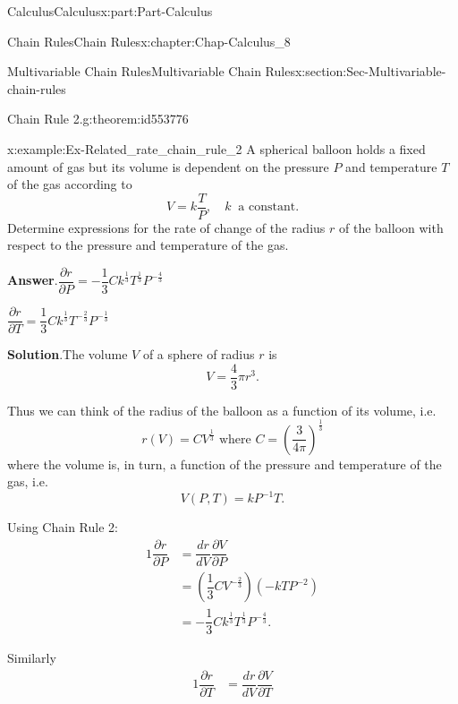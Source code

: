 \documentclass[oneside,10pt,]{book}
\newcommand{\blocktitlefont}{\relax}
\numberwithin{equation}{section}
\newcommand{\amp}{&}
\begin{document}
\begin{partptx}{Calculus}{}{Calculus}{}{}{x:part:Part-Calculus}
\begin{chapterptx}{Chain Rules}{}{Chain Rules}{}{}{x:chapter:Chap-Calculus_8}
\begin{sectionptx}{Multivariable Chain Rules}{}{Multivariable Chain Rules}{}{}{x:section:Sec-Multivariable-chain-rules}
\begin{theorem}{Chain Rule 2.}{}{g:theorem:id553776}
\begin{equation*}
\end{equation*}
%
\end{theorem}
\begin{example}{}{x:example:Ex-Related_rate_chain_rule_2}%
A spherical balloon holds a fixed amount of gas but its volume is dependent on the pressure \(P\) and temperature \(T\) of the gas according to%
\begin{equation*}
V=k\dfrac{T}{P}, \quad k \ \text{ a constant}.
\end{equation*}
Determine expressions for the rate of change of the radius \(r\) of the balloon with respect to the pressure and temperature of the gas.%
\par\smallskip%
\noindent\textbf{\blocktitlefont Answer}.\hypertarget{g:answer:id553827}{}\quad{}\(\dfrac{\partial r}{\partial P} = -\dfrac{1}{3}Ck^{\frac{1}{3}}T^{\frac{1}{3}}P^{-\frac{4}{3}}\)%
\par
\(\dfrac{\partial r}{\partial T} =  \dfrac{1}{3}Ck^{\frac{1}{3}}T^{-\frac{2}{3}}P^{-\frac{1}{3}}\)%
\par\smallskip%
\noindent\textbf{\blocktitlefont Solution}.\hypertarget{g:solution:id553838}{}\quad{}The volume \(V\) of a sphere of radius \(r\) is%
\begin{equation*}
V = \dfrac{4}{3}\pi r^3.
\end{equation*}
%
\par
Thus we can think of the radius of the balloon as a function of its volume, i.e.%
\begin{equation*}
r(V) = CV^{\frac{1}{3}} \text{ where } C=\left(\dfrac{3}{4\pi}\right)^{\frac{1}{3}}
\end{equation*}
where the volume is, in turn, a function of the pressure and temperature of the gas, i.e.%
\begin{equation*}
V(P,T) = kP^{-1}T.
\end{equation*}
%
\par
Using Chain Rule 2:%
\begin{alignat*}{1}
\dfrac{\partial r}{\partial P} \amp = \dfrac{dr}{dV}\dfrac{\partial V}{\partial P}\\
\amp =  \left(\dfrac{1}{3}CV^{-\frac{2}{3}}\right)(-kTP^{-2})\\
\amp = -\dfrac{1}{3}Ck^{\frac{1}{3}}T^{\frac{1}{3}}P^{-\frac{4}{3}}.
\end{alignat*}
%
\par
Similarly%
\begin{alignat*}{1}
\dfrac{\partial r}{\partial T} \amp = \dfrac{dr}{dV}\dfrac{\partial V}{\partial T}\\

\end{alignat*}
\end{example}
\end{sectionptx}
\end{chapterptx}
\end{partptx}
\end{document}
